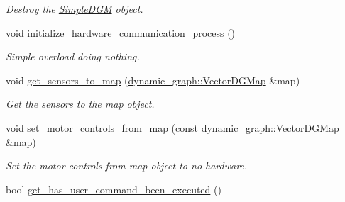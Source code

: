 \begin{DoxyCompactItemize}
\begin{DoxyCompactList}\small\item\em Destroy the \hyperlink{classdynamic__graph__manager_1_1SimpleDGM}{Simple\+D\+GM} object. \end{DoxyCompactList}\item 
void \hyperlink{classdynamic__graph__manager_1_1SimpleDGM_a5d771fc5a9ae6dd524a658d50fbee5d3}{initialize\+\_\+hardware\+\_\+communication\+\_\+process} ()
\begin{DoxyCompactList}\small\item\em Simple overload doing nothing. \end{DoxyCompactList}\item 
void \hyperlink{classdynamic__graph__manager_1_1SimpleDGM_aa92cd33a31c934835252f834bab7b9f4}{get\+\_\+sensors\+\_\+to\+\_\+map} (\hyperlink{namespacedynamic__graph_a51212ed7fa4ae81e7b362a27f09b7ab8}{dynamic\+\_\+graph\+::\+Vector\+D\+G\+Map} \&map)
\begin{DoxyCompactList}\small\item\em Get the sensors to the map object. \end{DoxyCompactList}\item 
void \hyperlink{classdynamic__graph__manager_1_1SimpleDGM_ad38ccd35cc0c409a0aaefa8565634109}{set\+\_\+motor\+\_\+controls\+\_\+from\+\_\+map} (const \hyperlink{namespacedynamic__graph_a51212ed7fa4ae81e7b362a27f09b7ab8}{dynamic\+\_\+graph\+::\+Vector\+D\+G\+Map} \&map)
\begin{DoxyCompactList}\small\item\em Set the motor controls from map object to no hardware. \end{DoxyCompactList}\item 
bool \hyperlink{classdynamic__graph__manager_1_1SimpleDGM_a08793eb7410b2820e00e028688d890a9}{get\+\_\+has\+\_\+user\+\_\+command\+\_\+been\+\_\+executed} ()\hypertarget{classdynamic__graph__manager_1_1SimpleDGM_a08793eb7410b2820e00e028688d890a9}{}\label{classdynamic__graph__manager_1_1SimpleDGM_a08793eb7410b2820e00e028688d890a9}


\end{DoxyCompactItemize}
